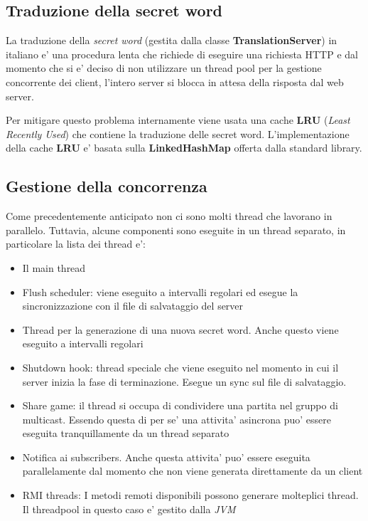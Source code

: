 \subsection{Traduzione della secret word}

La traduzione della \emph{secret word} (gestita dalla classe \textbf{TranslationServer}) in italiano e' una procedura lenta che richiede di eseguire una richiesta HTTP e dal momento che si e' deciso di non utilizzare un thread pool per la gestione concorrente dei client, l'intero server si blocca in attesa della risposta dal web server.

Per mitigare questo problema internamente viene usata una cache \textbf{LRU} (\emph{Least Recently Used}) che contiene la traduzione delle secret word. L'implementazione della cache \textbf{LRU} e' basata sulla \textbf{LinkedHashMap} offerta dalla standard library.

\subsection{Gestione della concorrenza}

Come precedentemente anticipato non ci sono molti thread che lavorano in parallelo. Tuttavia, alcune componenti sono eseguite in un thread separato, in particolare la lista dei thread e':
\begin{itemize}
	\item Il main thread
	\item Flush scheduler: viene eseguito a intervalli regolari ed esegue la sincronizzazione con il file di salvataggio del server
	\item Thread per la generazione di una nuova secret word. Anche questo viene eseguito a intervalli regolari
	\item Shutdown hook: thread speciale che viene eseguito nel momento in cui il server inizia la fase di terminazione. Esegue un sync sul file di salvataggio.
	\item Share game: il thread si occupa di condividere una partita nel gruppo di multicast. Essendo questa di per se' una attivita' asincrona puo' essere eseguita tranquillamente da un thread separato
	\item Notifica ai subscribers. Anche questa attivita' puo' essere eseguita parallelamente dal momento che non viene generata direttamente da un client
	\item RMI threads: I metodi remoti disponibili possono generare molteplici thread. Il threadpool in questo caso e' gestito dalla \emph{JVM}
\end{itemize}

